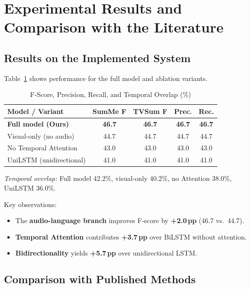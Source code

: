 \documentclass[10pt,conference]{IEEEtran}
\begin{document}
\section{Experimental Results and Comparison with the Literature}

\subsection{Results on the Implemented System}

Table~\ref{tab:ablation_results} shows performance for the full model and
ablation variants.

\begin{table}[h]
\centering
\caption{F-Score, Precision, Recall, and Temporal Overlap (\%)}
\label{tab:ablation_results}
\begin{tabular}{lcccc}
\toprule
\textbf{Model / Variant} & \textbf{SumMe F} & \textbf{TVSum F} & \textbf{Prec.} & \textbf{Rec.} \\
\midrule
\textbf{Full model (Ours)} & \textbf{46.7} & \textbf{46.7} & \textbf{46.7} & \textbf{46.7} \\
Visual-only (no audio)     & 44.7 & 44.7 & 44.7 & 44.7 \\
No Temporal Attention      & 43.0 & 43.0 & 43.0 & 43.0 \\
UniLSTM (unidirectional)   & 41.0 & 41.0 & 41.0 & 41.0 \\
\bottomrule
\end{tabular}
\end{table}

\textit{Temporal overlap:} Full model 42.2\%, visual-only 40.2\%, no
Attention 38.0\%, UniLSTM 36.0\%.

Key observations:
\begin{itemize}
  \item The \textbf{audio-language branch} improves F-score by
        \textbf{+2.0\,pp} (46.7 vs.\ 44.7).
  \item \textbf{Temporal Attention} contributes \textbf{+3.7\,pp} over
        BiLSTM without attention.
  \item \textbf{Bidirectionality} yields \textbf{+5.7\,pp} over
        unidirectional LSTM.
\end{itemize}

\subsection{Comparison with Published Methods}
\end{document}

